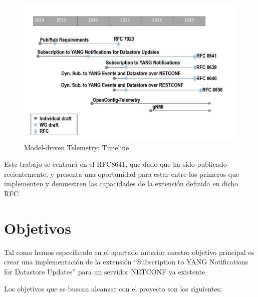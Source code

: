     \begin{figure}[H]
        \centering
        \includegraphics[scale=.5]{graphics/telemetry-history-2-1024x657.jpg}
        \caption{Model-driven Telemetry: Timeline}
        \label{fig:telemetry_history}
    \end{figure}
    
    Este trabajo se centrará en el RFC8641\cite{RFC8641}, que dado que ha sido publicado recientemente, y presenta una oportunidad para estar entre los primeros que implementen y demuestren las capacidades de la extensión definida en dicho \gls{RFC}.

\section{Objetivos}
    Tal como hemos especificado en el apartado anterior nuestro objetivo principal es crear una implementación de la extensión \enquote{Subscription to YANG Notifications for Datastore Updates} para un servidor NETCONF ya existente.

Los objetivos que se buscan alcanzar con el proyecto son los siguientes:

